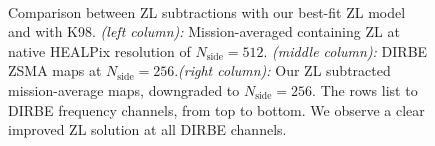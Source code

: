 \documentclass[twocolumn]{aa}
\begin{document}
\begin{figure}
    \\
    \caption{Comparison between ZL subtractions with our best-fit ZL model and with K98. 
    \textit{(left column):} Mission-averaged containing ZL at native HEALPix resolution 
    of $N_\mathrm{side} = 512$. \textit{(middle column):} DIRBE ZSMA maps
    at $N_\mathrm{side} = 256$.\textit{(right column):} Our ZL subtracted mission-average 
    maps, downgraded to $N_\mathrm{side} = 256$. The rows list to DIRBE frequency channels, from top to 
    bottom. We observe a clear improved ZL solution at all DIRBE channels.
    }
    \label{fig:dr2-zsma-compare1}
\end{figure}
\end{document}
